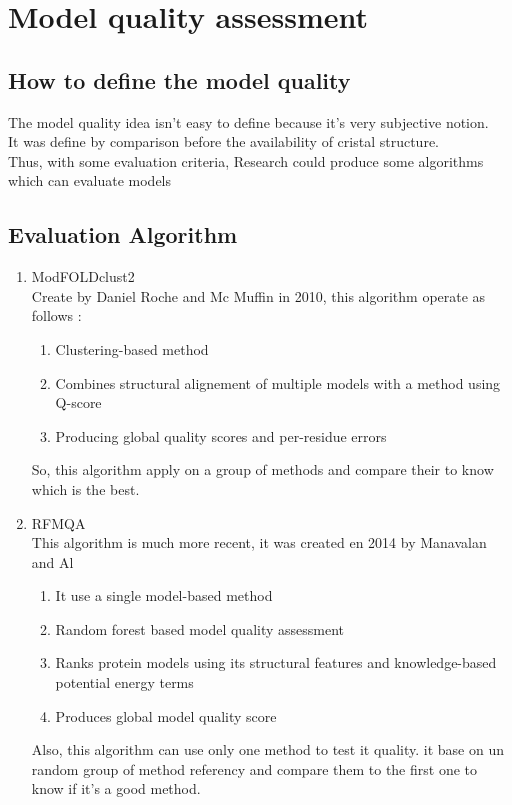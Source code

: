 \section{Model quality assessment}
\subsection{How to define the model quality}
   The model quality idea isn't easy to define because it's very subjective notion.\\
   It was define by comparison before the availability of cristal structure.\\

   Thus, with some evaluation criteria, Research could produce some algorithms which can evaluate models

\subsection{Evaluation Algorithm}
   \begin{enumerate}
	\item ModFOLDclust2\\
          Create by Daniel Roche and Mc Muffin in 2010, this algorithm operate as follows :
	  \begin{enumerate}
             \item Clustering-based method
             \item Combines structural alignement of multiple models with a method using Q-score
             \item Producing global quality scores and per-residue errors
	  \end{enumerate}
          So, this algorithm apply on a group of methods and compare their to know which is the best.
	\item RFMQA \\
          This algorithm is much more recent, it was created en 2014 by Manavalan and Al
	  \begin{enumerate}
             \item It use a single model-based method
             \item Random forest based model quality assessment
             \item Ranks protein models using its structural features and knowledge-based potential energy terms
             \item Produces global model quality score
	  \end{enumerate}
          Also, this algorithm can use only one method to test it quality. it base on un random group of method referency and compare them to the first one to know if it's a good method.
          
   \end{enumerate}



